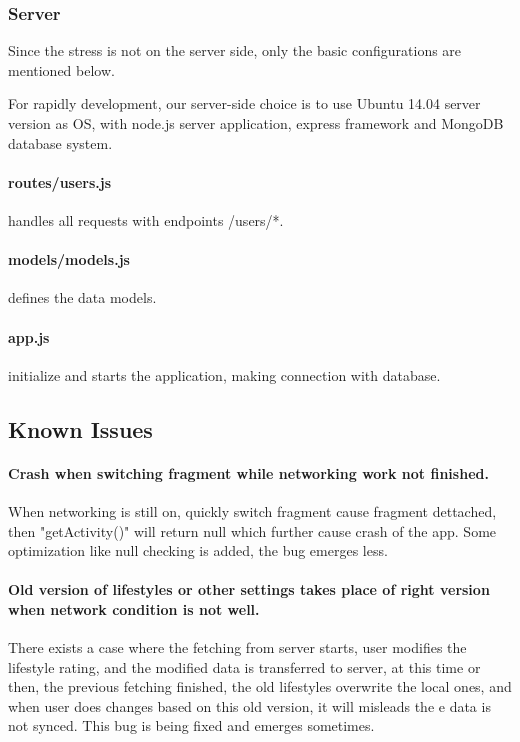 \documentclass[10pt,a4paper,final]{scrartcl}
\begin{document}
\subsubsection{Server}

Since the stress is not on the server side, only the basic configurations are mentioned below.

For rapidly development, our server-side choice is to use Ubuntu 14.04 server version as OS, with node.js server application, express framework and MongoDB database system. 

\paragraph{routes/users.js} handles all requests with endpoints /users/*.
\paragraph{models/models.js} defines the data models.
\paragraph{app.js} initialize and starts the application, making connection with database.

\subsection{Known Issues}

\paragraph{Crash when switching fragment while networking work not finished.} 
When networking is still on, quickly switch fragment cause fragment dettached, then "getActivity()" will return null which further cause crash of the app. Some optimization like null checking is added, the bug emerges less. 
\paragraph{Old version of lifestyles or other settings takes place of right version when network condition is not well.}
There exists a case where the fetching from server starts, user modifies the lifestyle rating, and the modified data is transferred to server, at this time or then, the previous fetching finished, the old lifestyles overwrite the local ones, and when user does changes based on this old version, it will misleads the e data is not synced. This bug is being fixed and emerges sometimes. 
\end{document}
